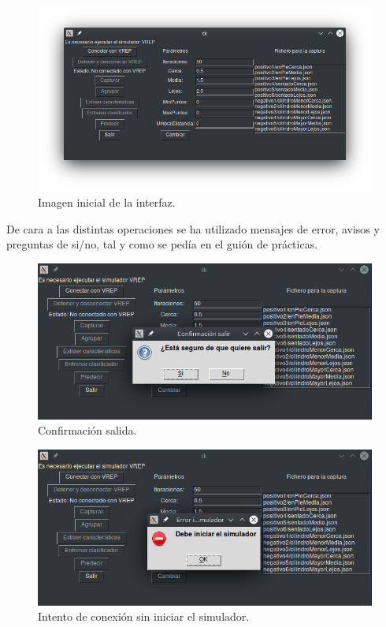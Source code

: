 \documentclass[12pt, spanish]{article}
\begin{document}
\begin{figure}[H]
    \centering
    \includegraphics[width=\textwidth]{interfaz_vacia.png}
    \caption{Imagen inicial de la interfaz.}
\end{figure}

De cara a las distintas operaciones se ha utilizado mensajes de error, avisos y preguntas de si/no, tal y como se pedía en el guión de prácticas.

\begin{figure}[H]
    \centering
    \includegraphics[width=\textwidth]{pregunta_salida.png}
    \caption{Confirmación salida.}
\end{figure}

\begin{figure}[H]
    \centering
    \includegraphics[width=\textwidth]{intento_conexion.png}
    \caption{Intento de conexión sin iniciar el simulador.}
\end{figure}
\end{document}
